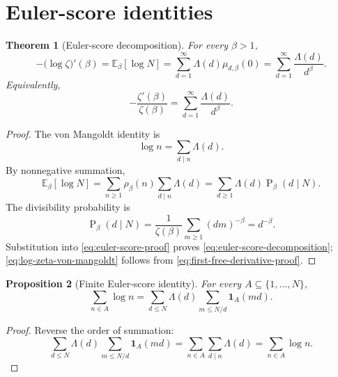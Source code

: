 \documentclass[11pt]{article}
\numberwithin{equation}{section}
\newtheorem{theorem}{Theorem}[section]
\newtheorem{proposition}[theorem]{Proposition}
\theoremstyle{definition}
\theoremstyle{remark}
\DeclareMathOperator{\Prob}{P}
\newcommand{\E}{\mathbb E}
\newcommand{\1}{\mathbf 1}
\begin{document}
\section{Euler-score identities}

\begin{theorem}[Euler-score decomposition]
\label{thm:euler-score-decomposition}
For every \(\beta>1\),
\begin{equation}
\label{eq:euler-score-decomposition}
-\bigl(\log\zeta\bigr)'(\beta)
=\E_\beta[\log N]
=\sum_{d=1}^{\infty}\Lambda(d)\mu_{d,\beta}(0)
=\sum_{d=1}^{\infty}\frac{\Lambda(d)}{d^\beta}.
\end{equation}
Equivalently,
\begin{equation}
\label{eq:log-zeta-von-mangoldt}
-\frac{\zeta'(\beta)}{\zeta(\beta)}
=\sum_{d=1}^{\infty}\frac{\Lambda(d)}{d^\beta}.
\end{equation}
\end{theorem}

\begin{proof}
The von Mangoldt identity is
\begin{equation}
\label{eq:mangoldt-identity}
\log n=\sum_{d\mid n}\Lambda(d).
\end{equation}
By nonnegative summation,
\begin{equation}
\label{eq:euler-score-proof}
\E_\beta[\log N]
=\sum_{n\ge1}\rho_\beta(n)\sum_{d\mid n}\Lambda(d)
=\sum_{d\ge1}\Lambda(d)\Prob_\beta(d\mid N).
\end{equation}
The divisibility probability is
\begin{equation}
\label{eq:divisibility-probability}
\Prob_\beta(d\mid N)
=\frac1{\zeta(\beta)}\sum_{m\ge1}(dm)^{-\beta}
=d^{-\beta}.
\end{equation}
Substitution into \eqref{eq:euler-score-proof} proves \eqref{eq:euler-score-decomposition}; \eqref{eq:log-zeta-von-mangoldt} follows from \eqref{eq:first-free-derivative-proof}.
\end{proof}

\begin{proposition}[Finite Euler-score identity]
\label{prop:finite-euler-score}
For every \(A\subseteq\{1,\ldots,N\}\),
\begin{equation}
\label{eq:finite-euler-score}
\sum_{n\in A}\log n
=\sum_{d\le N}\Lambda(d)\sum_{m\le N/d}\1_A(md).
\end{equation}
\end{proposition}

\begin{proof}
Reverse the order of summation:
\begin{equation}
\label{eq:finite-euler-score-proof}
\sum_{d\le N}\Lambda(d)\sum_{m\le N/d}\1_A(md)
=\sum_{n\in A}\sum_{d\mid n}\Lambda(d)
=\sum_{n\in A}\log n.
\end{equation}
\end{proof}
\end{document}
